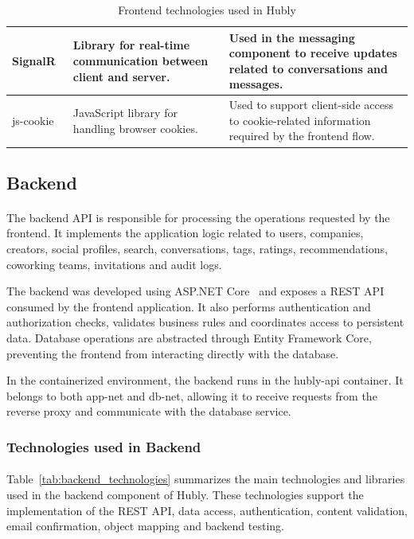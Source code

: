 \begin{table}[H]
\begin{tabular}{|p{}|p{}|p{}|}
SignalR~\cite{signalr} & Library for real-time communication between client and server. & Used in the messaging component to receive updates related to conversations and messages. \\ \hline
js-cookie~\cite{jscookie} & JavaScript library for handling browser cookies. & Used to support client-side access to cookie-related information required by the frontend flow. \\ \hline
\end{tabular}
\caption{Frontend technologies used in Hubly}
\label{tab}
\end{table}

\subsection{Backend}
\paragraph{}The backend API is responsible for processing the operations requested by the frontend. It implements the application logic related to users, companies, creators, social profiles, search, conversations, tags, ratings, recommendations, coworking teams, invitations and audit logs.

The backend was developed using ASP.NET Core~\cite{aspnetcore} and exposes a REST API consumed by the frontend application. It also performs authentication and authorization checks, validates business rules and coordinates access to persistent data. Database operations are abstracted through Entity Framework Core, preventing the frontend from interacting directly with the database.

In the containerized environment, the backend runs in the hubly-api container. It belongs to both app-net and db-net, allowing it to receive requests from the reverse proxy and communicate with the database service.

\subsubsection{Technologies used in Backend}
\paragraph{}Table~\ref{tab:backend_technologies} summarizes the main technologies and libraries used in the backend component of Hubly. These technologies support the implementation of the REST API, data access, authentication, content validation, email confirmation, object mapping and backend testing.

